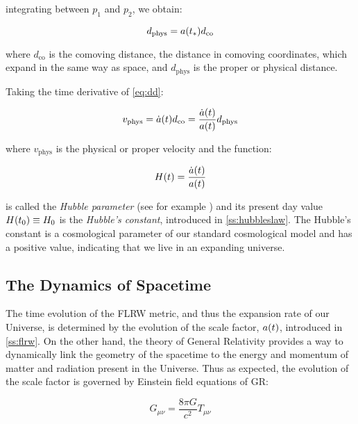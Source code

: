 integrating between $p_1$ and $p_2$, we obtain:

\begin{equation}
        d_{\text{phys}} = a\qty(t_*)d_{\text{co}}
        \label{eq:dd}
\end{equation}

where $d_{\text{co}}$ is the comoving distance, the distance in comoving
coordinates, which expand in the same way as space, and $d_\text{phys}$ is
the proper or physical distance.

Taking the time derivative of \autoref{eq:dd}:

\begin{equation}
        v_{\text{phys}} = \dot a\qty(t) d_{\text{co}} = \frac{\dot a\qty(t)}{a\qty(t)} d_{\text{phys}}
\end{equation}

where $v_{\text{phys}}$ is the physical or proper velocity and the function:

\begin{equation}
        H\qty(t) = \frac{\dot a\qty(t)}{a\qty(t)}
        \label{eq:hubble_parameter}
\end{equation}

is called the \emph{Hubble parameter} (see for example
\cite{weinberg2008cosmology}) and its present day value $H\qty(t_0)
\equiv H_0$ is the \emph{Hubble's constant}, introduced in
\autoref{ss:hubbleslaw}. The Hubble's constant is a cosmological
parameter of our standard cosmological model and has a positive value,
indicating that we live in an expanding universe.

\subsection{The Dynamics of Spacetime}

The time evolution of the FLRW metric, and thus the expansion rate of our
Universe, is determined by the evolution of the scale factor, $a\qty(t)$,
introduced in \autoref{ss:flrw}. On the other hand, the theory of General
Relativity provides a way to dynamically link the geometry of the spacetime
to the energy and momentum of matter and radiation present in the Universe.
Thus as expected, the evolution of the scale factor is governed by Einstein
field equations of GR:

\begin{equation}
        G_{\mu \nu} = \frac{8 \pi G}{c^2} T_{\mu \nu}
        \label{eq:einstein}
\end{equation}


